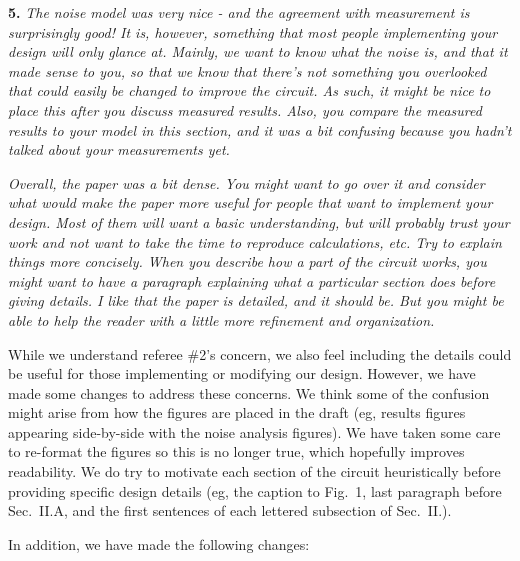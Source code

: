 \documentclass[12pt, oneside]{letter}   	%
\begin{document}
\textbf{5.}
\textit{The noise model was very nice - and the agreement with measurement is surprisingly good! It is, however, something that most people implementing your design will only glance at. Mainly, we want to know what the noise is, and that it made sense to you, so that we know that there's not something you overlooked that could easily be changed to improve the circuit. As such, it might be nice to place this after you discuss measured results. Also, you compare the measured results to your model in this section, and it was a bit confusing because you hadn't talked about your measurements yet.}

\textit{Overall, the paper was a bit dense. You might want to go over it and consider what would make the paper more useful for people that want to implement your design. Most of them will want a basic understanding, but will probably trust your work and not want to take the time to reproduce calculations, etc. Try to explain things more concisely. When you describe how a part of the circuit works, you might want to have a paragraph explaining what a particular section does before giving details. I like that the paper is detailed, and it should be. But you might be able to help the reader with a little more refinement and organization.}

While we understand referee \#2's concern, we also feel including the details could be useful for those implementing or modifying our design.
However, we have made some changes to address these concerns.
We think some of the confusion might arise from how the figures are placed in the draft (eg, results figures appearing side-by-side with the noise analysis figures).
We have taken some care to re-format the figures so this is no longer true, which hopefully improves readability.
We do try to motivate each section of the circuit heuristically before providing specific design details (eg, the caption to Fig.~1, last paragraph before Sec.~II.A, and the first sentences of each lettered subsection of Sec.~II.).

In addition, we have made the following changes:
\end{document}
